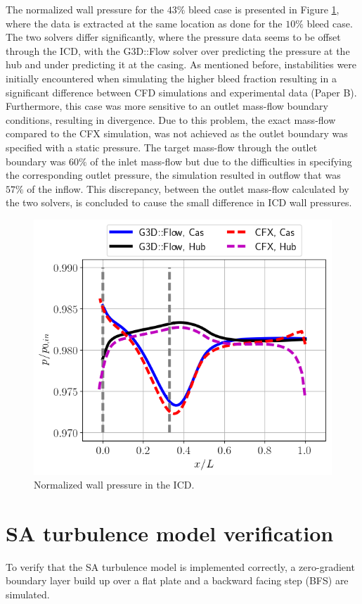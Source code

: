 The normalized wall pressure for the $43\%$ bleed case is presented in Figure \ref{fig:duct40}, where the data is extracted at the same location as done for the $10\%$ bleed case. The two solvers differ significantly, where the pressure data seems to be offset through the ICD, with the G3D::Flow solver over predicting the pressure at the hub and under predicting it at the casing. As mentioned before, instabilities were initially encountered when simulating the higher bleed fraction resulting in a significant difference between CFD simulations and experimental data (Paper B). Furthermore, this case was more sensitive to an outlet mass-flow boundary conditions, resulting in divergence. Due to this problem, the exact mass-flow compared to the CFX simulation, was not achieved as the outlet boundary was specified with a static pressure. The target mass-flow through the outlet boundary was $60\%$ of the inlet mass-flow but due to the difficulties in specifying the corresponding outlet pressure, the simulation resulted in outflow that was $57\%$ of the inflow. This discrepancy, between the outlet mass-flow calculated by the two solvers, is concluded to cause the small difference in ICD wall pressures.
\begin{figure}[h!]
  \centering
  \includegraphics[width=.6\textwidth]{figures/CFXG3dDuct40.png}
    \caption{Normalized wall pressure in the ICD.} \label{fig:duct40}
\end{figure}

%           
\chapter{SA turbulence model verification\label{ch:verification}}
To verify that the SA turbulence model is implemented correctly, a zero-gradient boundary layer build up over a flat plate and a backward facing step (BFS) are simulated. 

